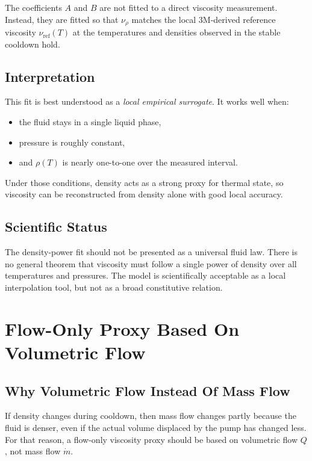 \documentclass[11pt]{article}
\begin{document}
The coefficients $A$ and $B$ are not fitted to a direct viscosity measurement.
Instead, they are fitted so that $\nu_{\rho}$ matches the local 3M-derived
reference viscosity $\nu_{\mathrm{ref}}(T)$ at the temperatures and densities
observed in the stable cooldown hold.

\subsection{Interpretation}

This fit is best understood as a \emph{local empirical surrogate}. It works
well when:
\begin{itemize}
    \item the fluid stays in a single liquid phase,
    \item pressure is roughly constant,
    \item and $\rho(T)$ is nearly one-to-one over the measured interval.
\end{itemize}

Under those conditions, density acts as a strong proxy for thermal state, so
viscosity can be reconstructed from density alone with good local accuracy.

\subsection{Scientific Status}

The density-power fit should not be presented as a universal fluid law. There
is no general theorem that viscosity must follow a single power of density over
all temperatures and pressures. The model is scientifically acceptable as a
local interpolation tool, but not as a broad constitutive relation.

\section{Flow-Only Proxy Based On Volumetric Flow}

\subsection{Why Volumetric Flow Instead Of Mass Flow}

If density changes during cooldown, then mass flow changes partly because the
fluid is denser, even if the actual volume displaced by the pump has changed
less. For that reason, a flow-only viscosity proxy should be based on
volumetric flow $Q$, not mass flow $\dot{m}$.
\end{document}
